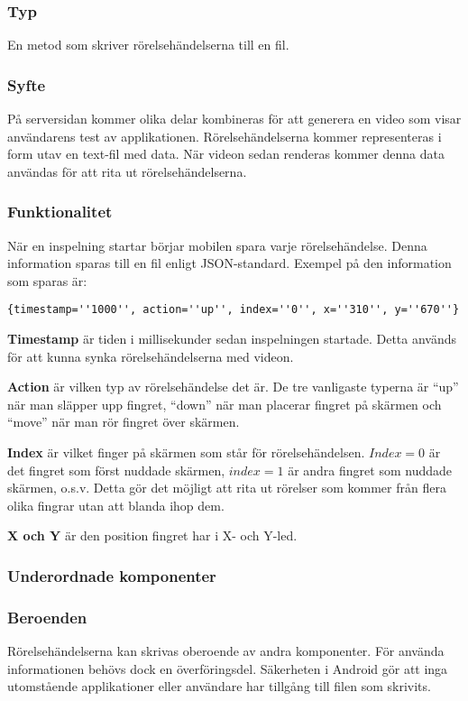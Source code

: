 \subsubsection{Typ}
En metod som skriver rörelsehändelserna till en fil.
\subsubsection{Syfte}
På serversidan kommer olika delar kombineras för att generera en video som visar användarens test av applikationen. Rörelsehändelserna kommer representeras i form utav en text-fil med data. När videon sedan renderas kommer denna data användas för att rita ut rörelsehändelserna.
\subsubsection{Funktionalitet}
När en inspelning startar börjar mobilen spara varje rörelsehändelse. Denna information sparas till en fil enligt JSON-standard. Exempel på den information som sparas är: \\
\begin{verbatim}
{timestamp=''1000'', action=''up'', index=''0'', x=''310'', y=''670''}
 \end{verbatim} 
 \textbf{Timestamp} är tiden i millisekunder sedan inspelningen startade. Detta används för att kunna synka rörelsehändelserna med videon.
 
 \textbf{Action} är vilken typ av rörelsehändelse det är. De tre vanligaste typerna är ``up'' när man släpper upp fingret, ``down'' när man placerar fingret på skärmen och ``move'' när man rör fingret över skärmen.
 
 \textbf{Index} är vilket finger på skärmen som står för rörelsehändelsen. $Index=0$ är det fingret som först nuddade skärmen, $index=1$ är andra fingret som nuddade skärmen, o.s.v. Detta gör det möjligt att rita ut rörelser som kommer från flera olika fingrar utan att blanda ihop dem.
 
 \textbf{X och Y} är den position fingret har i X- och Y-led.
\subsubsection{Underordnade komponenter}

\subsubsection{Beroenden}
Rörelsehändelserna kan skrivas oberoende av andra komponenter. För använda informationen behövs dock en överföringsdel. Säkerheten i Android gör att inga utomstående applikationer eller användare har tillgång till filen som skrivits. 
